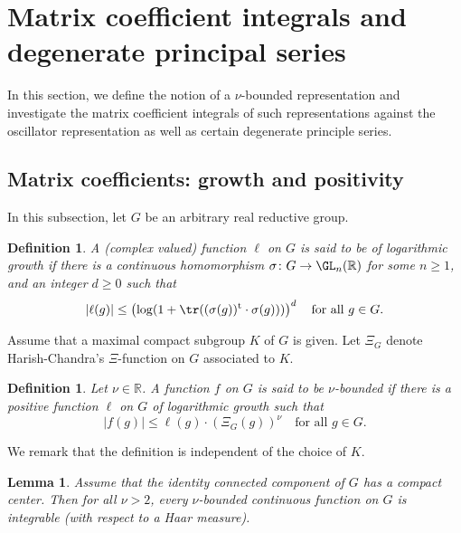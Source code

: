 \documentclass[12pt,a4paper]{amsart}
\def\abs#1{\left|{#1}\right|}
\newcommand{\R}{\mathbb R}
\numberwithin{equation}{section}
\newtheorem{lem}[thm]{Lemma}
\newtheorem{dfnl}[thm]{Definition}
\theoremstyle{remark}
\def\dliftv{\vartheta}
\begin{document}




\section{Matrix coefficient integrals and degenerate principal series}\label{sec:Integrals}

In this section, we define the notion of a $\nu$-bounded representation and investigate the
matrix coefficient integrals of such representations against the oscillator representation as well as certain
degenerate principle series.

\subsection{Matrix coefficients: growth and positivity}

In this subsection, let $G$ be an arbitrary  real reductive group.
\begin{dfnl}
  A (complex valued) function $\ell$ on $G$ is said to be of \emph{logarithmic
    growth} if there is a continuous homomorphism
  $\sigma\colon G\rightarrow \GL_n(\R)$ for some $n\geq 1$, and an integer
  $d\geq 0$ such that
  \[
    \abs{\ell(g)}\leq \left(\log(1+\tr((\sigma(g))^\mathrm{t} \cdot
      \sigma(g)))\right)^d\quad \textrm{for all }g\in G.
  \]

\end{dfnl}

Assume that a maximal compact subgroup $K$ of $G$ is given. Let $\Xi_{G}$ denote Harish-Chandra's $\Xi$-function on $G$ associated to $K$.
\begin{dfnl}
  Let $\nu\in \R$. A function $f$ on $G$ is said to be \emph{$\nu$-bounded} if
  there is a positive function $\ell$ on $G$ of logarithmic growth such that
  \[
    \abs{f(g)}\leq \ell(g) \cdot (\Xi_G (g))^\nu\quad \textrm{for all }g\in G.
  \]
\end{dfnl}

We remark that the definition is independent of the choice of $K$.


\begin{lem}\label{intgrability}
  Assume that the identity connected component of $G$ has a compact center. Then
  for all $\nu>2$, every $\nu$-bounded continuous function on $G$ is integrable
  (with respect to a Haar measure).
\end{lem}
\end{document}
